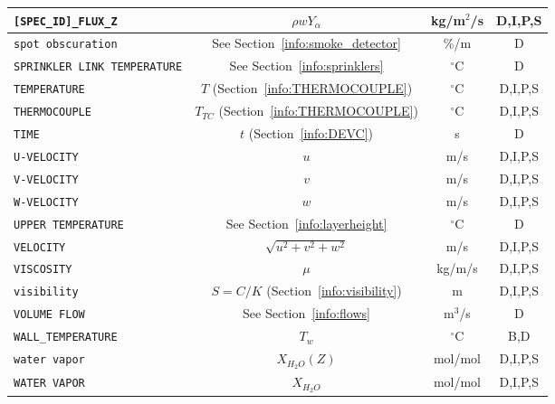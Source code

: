 \documentclass[11pt]{book}
\newcommand{\ct}{\tt\small}
\begin{document}
\begin{table}[h!]
\begin{center}
\begin{tabular}{|l|c|c|c|}
{\ct [SPEC\_ID]\_FLUX\_Z}                       & $\rho w Y_\alpha$                             & kg/m$^2$/s     & D,I,P,S      \\ \hline
{\ct spot obscuration}                          & See Section~\ref{info:smoke_detector}         & \%/m           & D            \\ \hline
{\ct SPRINKLER LINK TEMPERATURE}                & See Section~\ref{info:sprinklers}             & $^\circ$C      & D            \\ \hline
{\ct TEMPERATURE}                               & $T$ (Section~\ref{info:THERMOCOUPLE})         & $^\circ$C      & D,I,P,S      \\ \hline
{\ct THERMOCOUPLE}                              & $T_{TC}$ (Section~\ref{info:THERMOCOUPLE})    & $^\circ$C      & D,I,P,S      \\ \hline
{\ct TIME}                                      & $t$ (Section~\ref{info:DEVC})                 & s              & D            \\ \hline
{\ct U-VELOCITY}                                & $u$                                           & m/s            & D,I,P,S      \\ \hline
{\ct V-VELOCITY}                                & $v$                                           & m/s            & D,I,P,S      \\ \hline
{\ct W-VELOCITY}                                & $w$                                           & m/s            & D,I,P,S      \\ \hline
{\ct UPPER TEMPERATURE}                         & See Section~\ref{info:layerheight}            & $^\circ$C      & D            \\ \hline
{\ct VELOCITY}                                  & $\sqrt{u^2+v^2+w^2}$                          & m/s            & D,I,P,S      \\ \hline
{\ct VISCOSITY}                                 & $\mu$                                         & kg/m/s         & D,I,P,S      \\ \hline
{\ct visibility}                                & $S=C/K$ (Section~\ref{info:visibility})       & m              & D,I,P,S      \\ \hline
{\ct VOLUME FLOW}                               & See Section~\ref{info:flows}                  & m$^3$/s        & D            \\ \hline
{\ct WALL\_TEMPERATURE}                         & $T_w$                                         & $^\circ$C      & B,D          \\ \hline
{\ct water vapor}                               & $X_{H_2O}(Z)$                                 & mol/mol        & D,I,P,S      \\ \hline
{\ct WATER VAPOR}                               & $X_{H_2O}$                                    & mol/mol        & D,I,P,S      \\ \hline
\end{tabular}
\end{center}
\end{table}
\end{document}
